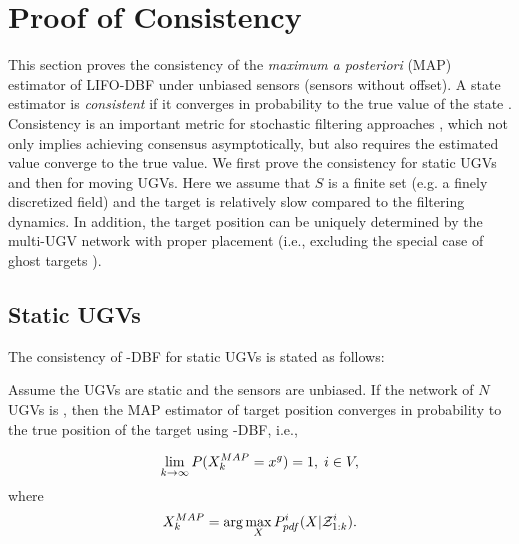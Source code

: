\section{Proof of Consistency}\label{sec:consist_proof}

	
	This section proves the consistency of the \textit{maximum a posteriori} (MAP) estimator of LIFO-DBF under unbiased sensors (sensors without offset).
	A state estimator is \textit{consistent} if it converges in probability to the true value of the state \cite{amemiya1985advanced}.
	Consistency is an important metric for stochastic filtering approaches \cite{chen2003bayesian}, which 
	not only implies achieving consensus asymptotically, but also requires the estimated value converge to the true value.	
	We first prove the consistency for static UGVs and then for moving UGVs. 
	Here we assume that $S$ is a finite set (e.g. a finely discretized field) and the target is relatively slow compared to the filtering dynamics.
	In addition, the target position can be uniquely determined by the multi-UGV network with proper placement (i.e., excluding the special case of ghost targets \cite{malanowski2012two}).
	
	\subsection{Static UGVs}	
	The consistency of \proto-DBF for static UGVs is stated as follows: 
	
	\begin{thm}\label{thm:\proto-dbf-sta-ugv}
		Assume the UGVs are static and the sensors are unbiased. If the network of $N$ UGVs is \fc, then the MAP estimator of target position converges in probability to the true position of the target using \proto-DBF, i.e.,
		
		\small\begin{equation*}
		\lim\limits_{k\rightarrow \infty}
		P(X_k^{MAP}=x^g)=
		1,\;i\in V,
		\end{equation*}\normalsize
		where 
		\small\begin{equation*}
		X_k^{MAP}=\arg\max\limits_{X}P^i_{pdf}(X|\mathcal{Z}^{i}_{1:k}).
		\end{equation*}		
	\end{thm}
	
